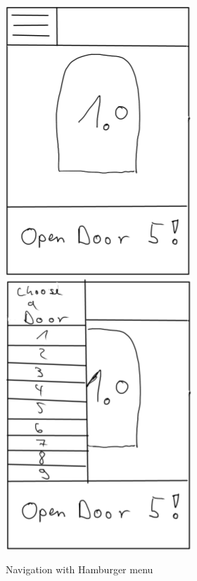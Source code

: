 \documentclass{beamer}
\begin{document}
\begin{frame}
		\begin{figure}
		\includegraphics[scale=0.2]{door1_hamburger.png}
		\hspace{1cm}
		\includegraphics[scale=0.2]{door1_hamburger_open.png}
		\caption{Navigation with Hamburger menu}
		\end{figure}

\end{frame}
\end{document}
